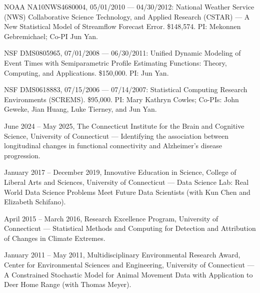 \documentclass[Statistics]{vita}
\begin{document}
\begin{vita}
\begin{Grants}
\begin{External}
    \item NOAA NA10NWS4680004, 05/01/2010 --- 04/30/2012: National Weather Service (NWS) Collaborative Science Technology, and Applied Research (CSTAR) --- A New Statistical Model of Streamflow Forecast Error. \$148,574. PI: Mekonnen Gebremichael; Co-PI Jun Yan.
    \item NSF DMS0805965, 07/01/2008 --- 06/30/2011: Unified Dynamic Modeling of Event Times with Semiparametric Profile Estimating Functions: Theory, Computing, and Applications. \$150,000. PI: Jun Yan.
    \item NSF DMS0618883, 07/15/2006 --- 07/14/2007: Statistical Computing Research Environments (SCREMS). \$95,000. PI: Mary Kathryn Cowles; Co-PIs: John Geweke, Jian Huang, Luke Tierney, and Jun Yan.
  \end{External}
  \begin{Internal}
  \item June 2024 -- May 2025, The Connecticut Institute for the Brain and Cognitive Science, University of Connecticut ---  Identifying the association between longitudinal changes in functional connectivity and Alzheimer's disease progression.
  \item January 2017 -- December 2019, Innovative Education in Science, College of Liberal Arts and Sciences, University of Connecticut --- Data Science Lab: Real World Data Science Problems Meet Future Data Scientists (with Kun Chen and Elizabeth Schifano).
  \item April 2015 -- March 2016, Research Excellence Program, University of Connecticut --- Statistical Methods and Computing for Detection and Attribution of Changes in Climate Extremes.
  \item January 2011 -- May 2011, Multidisciplinary Environmental Research Award, Center for Environmental Sciences and Engineering, University of Connecticut --- A Constrained Stochastic Model for Animal Movement Data with Application to Deer Home Range (with Thomas Meyer).

\end{Internal}
\end{Grants}
\end{vita}
\end{document}
